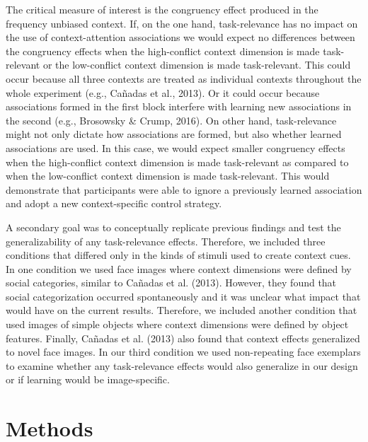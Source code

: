 \documentclass[english,,man,floatsintext]{apa6}
\begin{document}
The critical measure of interest is the congruency effect produced in the frequency unbiased context. If, on the one hand, task-relevance has no impact on the use of context-attention associations we would expect no differences between the congruency effects when the high-conflict context dimension is made task-relevant or the low-conflict context dimension is made task-relevant. This could occur because all three contexts are treated as individual contexts throughout the whole experiment (e.g., Cañadas et al., 2013). Or it could occur because associations formed in the first block interfere with learning new associations in the second (e.g., Brosowsky \& Crump, 2016). On other hand, task-relevance might not only dictate how associations are formed, but also whether learned associations are used. In this case, we would expect smaller congruency effects when the high-conflict context dimension is made task-relevant as compared to when the low-conflict context dimension is made task-relevant. This would demonstrate that participants were able to ignore a previously learned association and adopt a new context-specific control strategy.

A secondary goal was to conceptually replicate previous findings and test the generalizability of any task-relevance effects. Therefore, we included three conditions that differed only in the kinds of stimuli used to create context cues. In one condition we used face images where context dimensions were defined by social categories, similar to Cañadas et al. (2013). However, they found that social categorization occurred spontaneously and it was unclear what impact that would have on the current results. Therefore, we included another condition that used images of simple objects where context dimensions were defined by object features. Finally, Cañadas et al. (2013) also found that context effects generalized to novel face images. In our third condition we used non-repeating face exemplars to examine whether any task-relevance effects would also generalize in our design or if learning would be image-specific.

\hypertarget{methods}{%
\section{Methods}\label{methods}}
\end{document}
